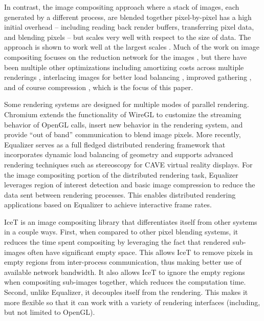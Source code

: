 \documentclass{vgtc}                          %
\begin{document}
In contrast, the image compositing approach where a stack of images, each generated by a different process, are blended together pixel-by-pixel has a high initial overhead -- including reading back render buffers, transferring pixel data, and blending pixels -- but scales very well with respect to the size of data.
The approach is shown to work well at the largest scales \cite{Childs2010,Moreland_2011}.
Much of the work on image compositing focuses on the reduction network for the images \cite{Lin2004,Ma1994,Moreland2018,Nonaka2018,Peterka2009,Yu2008}, but there have been multiple other optimizations including amortizing costs across multiple renderings \cite{Larsen2016}, interlacing images for better load balancing \cite{Takeuchi2003}, improved gathering \cite{Grosset2017}, and of course compression \cite{Ahrens1998,Moreland_2001,Yang1999}, which is the focus of this paper.

Some rendering systems are designed for multiple modes of parallel rendering.
Chromium \cite{Humphreys_2002} extends the functionality of WireGL \cite{Humphreys_2001} to customize the streaming behavior of OpenGL calls, insert new behavior in the rendering system, and provide ``out of band'' communication to blend image pixels.
More recently, Equalizer \cite{Eilemann_2009,Eilemann_2020} serves as a full fledged distributed rendering framework that incorporates dynamic load balancing of geometry and supports advanced rendering techniques such as stereoscopy for CAVE virtual reality displays. For the image compositing portion of the distributed rendering task, Equalizer leverages region of interest detection and basic image compression to reduce the data sent between rendering processes. This enables distributed rendering applications based on Equalizer to achieve interactive frame rates.

IceT \cite{Moreland_2011} is an image compositing library that differentiates itself from other systems in a couple ways. First, when compared to other pixel blending systems, it reduces the time spent compositing by leveraging the fact that rendered sub-images often have significant empty space. This allows IceT to remove pixels in empty regions from inter-process communication, thus making better use of available network bandwidth. It also allows IceT to ignore the empty regions when compositing sub-images together, which reduces the computation time. Second, unlike Equalizer, it decouples itself from the rendering. This makes it more flexible so that it can work with a variety of rendering interfaces (including, but not limited to OpenGL).
\end{document}

